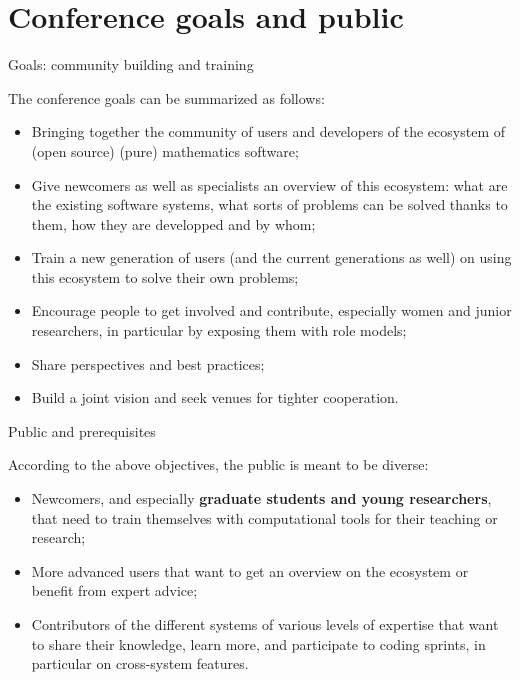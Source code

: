 \documentclass[12pt]{amsart}
\makeatletter
\def\subsection{\@startsection{subsection}{2}%
  \z@{.3\linespacing\@plus.5\linespacing}{.1\linespacing}%
  {\normalfont\bfseries}}
\makeatother
\begin{document}
\section{Conference goals and public}

\subsection{Goals: community building and training}

The conference goals can be summarized as follows:

\begin{itemize}
\item Bringing together the community of users and developers of the
  ecosystem of (open source) (pure) mathematics software;
\item Give newcomers as well as specialists an overview of this
  ecosystem: what are the existing software systems, what sorts of
  problems can be solved thanks to them, how they are developped and
  by whom;
\item Train a new generation of users (and the current generations as
  well) on using this ecosystem to solve their own problems;
\item Encourage people to get involved and contribute, especially
  women and junior researchers, in particular by exposing them with role models;
\item Share perspectives and best practices;
\item Build a joint vision and
  seek venues for tighter cooperation.
\end{itemize}

\subsection{Public and prerequisites}

According to the above objectives, the public is meant to be diverse:
\begin{itemize}
\item Newcomers, and especially \textbf{graduate students and young
    researchers}, that need to train themselves with computational
  tools for their teaching or research;
\item More advanced users that want to get an overview on the
  ecosystem or benefit from expert advice;
\item Contributors of the different systems of various levels of
  expertise that want to share their knowledge, learn more, and
  participate to coding sprints, in particular on cross-system
  features.
\end{itemize}
\end{document}
